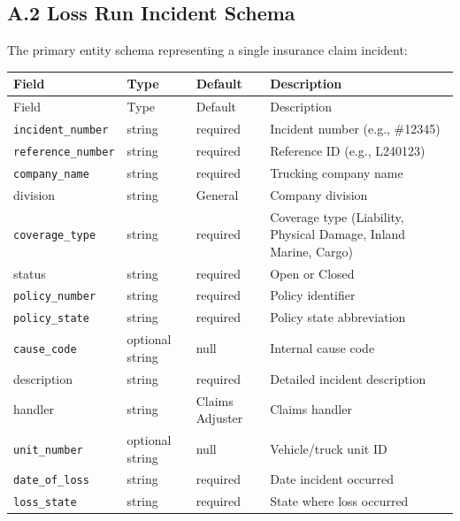 \subsection*{A.2 Loss Run Incident Schema}

The primary entity schema representing a single insurance claim incident:

\begingroup
\small
\setlength{\tabcolsep}{3pt}
\renewcommand{\arraystretch}{1.15}
\begin{longtable}{@{}>{\raggedright\arraybackslash}p{} >{\raggedright\arraybackslash}p{} >{\raggedright\arraybackslash}p{} >{\raggedright\arraybackslash}p{}@{}}
\toprule
Field & Type & Default & Description \\
\midrule
\endfirsthead
\toprule
Field & Type & Default & Description \\
\midrule
\endhead
\midrule
\endfoot
\bottomrule
\endlastfoot
\texttt{incident\_\allowbreak number} & string & required & Incident number (e.g., \#12345) \\
\texttt{reference\_\allowbreak number} & string & required & Reference ID (e.g., L240123) \\
\texttt{company\_\allowbreak name} & string & required & Trucking company name \\
division & string & General & Company division \\
\texttt{coverage\_\allowbreak type} & string & required & Coverage type (Liability, Physical Damage, Inland Marine, Cargo) \\
status & string & required & Open or Closed \\
\texttt{policy\_\allowbreak number} & string & required & Policy identifier \\
\texttt{policy\_\allowbreak state} & string & required & Policy state abbreviation \\
\texttt{cause\_\allowbreak code} & optional string & null & Internal cause code \\
description & string & required & Detailed incident description \\
handler & string & Claims Adjuster & Claims handler \\
\texttt{unit\_\allowbreak number} & optional string & null & Vehicle/truck unit ID \\
\texttt{date\_\allowbreak of\_\allowbreak loss} & string & required & Date incident occurred \\
\texttt{loss\_\allowbreak state} & string & required & State where loss occurred \\

\end{longtable}
